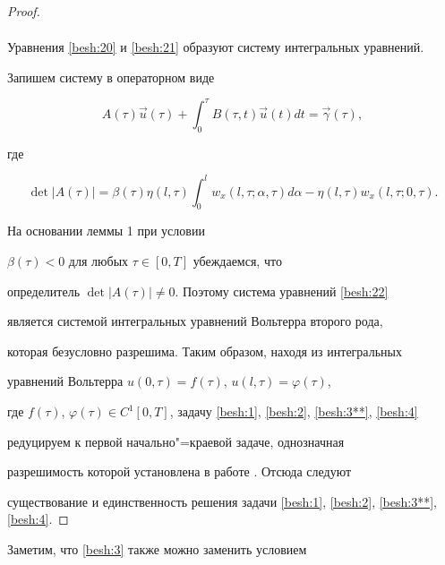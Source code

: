 \begin{proof}
\begin{multline*}
\end{multline*}







Уравнения \eqref{besh:20} и \eqref{besh:21} образуют систему интегральных уравнений.

Запишем систему в операторном виде

\begin{equation}

A(\tau)\overrightarrow{u}(\tau)+\int^{\tau}_0B(\tau,t)\overrightarrow{u}(t)

dt=\overrightarrow{\gamma}(\tau),

\label{besh:22}

\end{equation}

где

$$

\det| A(\tau)|=\beta(\tau)\eta(l,\tau)\int^{l}_{0}

w_{x}(l,\tau;\alpha,\tau)d\alpha - \eta(l,\tau)w_{x}(l,\tau;0,\tau).

$$



На основании леммы 1 при условии

$\beta(\tau)<0$ для любых $\tau \in [0,T]$ убеждаемся, что

определитель $\det |A(\tau)|\neq 0$. Поэтому система уравнений \eqref{besh:22}

является системой интегральных уравнений Вольтерра второго рода,

которая безусловно разрешима. Таким образом, находя из интегральных

уравнений Вольтерра $u(0,\tau)=f(\tau)$, $u(l,\tau)=\varphi(\tau)$,

где $f(\tau)$, $\varphi(\tau)\in C^1[0,T]$, задачу \eqref{besh:1}, \eqref{besh:2}, \eqref{besh:3**}, \eqref{besh:4}

редуцируем к первой начально"=краевой задаче, однозначная

разрешимость которой установлена в работе \cite{besh:bib:Shhanukov}. Отсюда следуют

существование и единственность решения задачи \eqref{besh:1}, \eqref{besh:2}, \eqref{besh:3**}, \eqref{besh:4}. \end{proof}



\smallskip



Заметим, что \eqref{besh:3} также можно заменить условием

